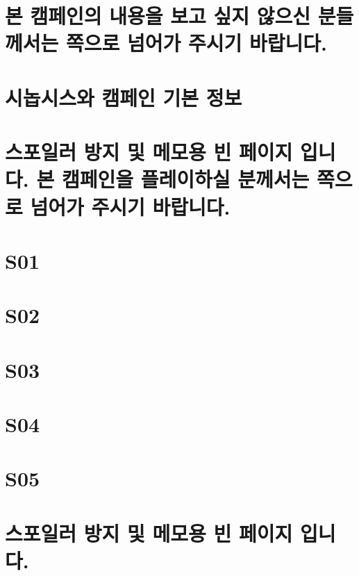 \documentclass{report}
\begin{document}
	\chapter*{본 캠페인의 내용을 보고 싶지 않으신 분들께서는 \pageref{endof_Rescue}쪽으로 넘어가 주시기 바랍니다.}
	
	\chapter{시놉시스와 캠페인 기본 정보}
		
	
	\chapter*{스포일러 방지 및 메모용 빈 페이지 입니다. 본 캠페인을 플레이하실 분께서는 \pageref{endof_Rescue}쪽으로 넘어가 주시기 바랍니다.}
	
	\parttoc
	
	\chapter{S01}
		
	\label{endof_Rescue_S01}
	
	\chapter{S02}
		
	\label{endof_Rescue_S02}
	
	\chapter{S03}
		
	\label{endof_Rescue_S03}
	
	\chapter{S04}
		
	\label{endof_Rescue_S04}
	
	\chapter{S05}
		
	\label{endof_Rescue_S05}
	
	\chapter*{스포일러 방지 및 메모용 빈 페이지 입니다.}
\end{document}
